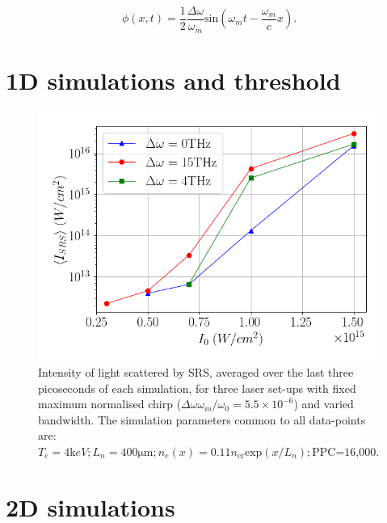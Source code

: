 \begin{equation}
	\phi(x,t) = \frac{1}{2}\frac{\Delta\omega}{\omega_m}\text{sin}	 	 \left(\omega_mt - \frac{\omega_m}{c}x\right).
\end{equation}

\section{1D simulations and threshold}

\begin{figure}[ht]
   \centering
    \includegraphics[width=0.75\columnwidth]{Chapters/C5_broadband/bandwidth_no_dependence_Wen.png}
    \caption{Intensity of light scattered by SRS, averaged over the last three picoseconds of each simulation, for three laser set-ups with fixed maximum normalised chirp ($\Delta\omega \omega_m / \omega_0=5.5\times10^{-6}$) and varied bandwidth. The simulation parameters common to all data-points are: $T_e = 4\si{\kilo eV}; L_n = 400\si{\micro\metre}; n_e(x) = 0.11n_{\text{cr}}\text{exp}(x/L_n);\text{PPC=16,000}. $}
    \label{fig:pumpdepletion}
\end{figure}{}


\section{2D simulations}



%
%
